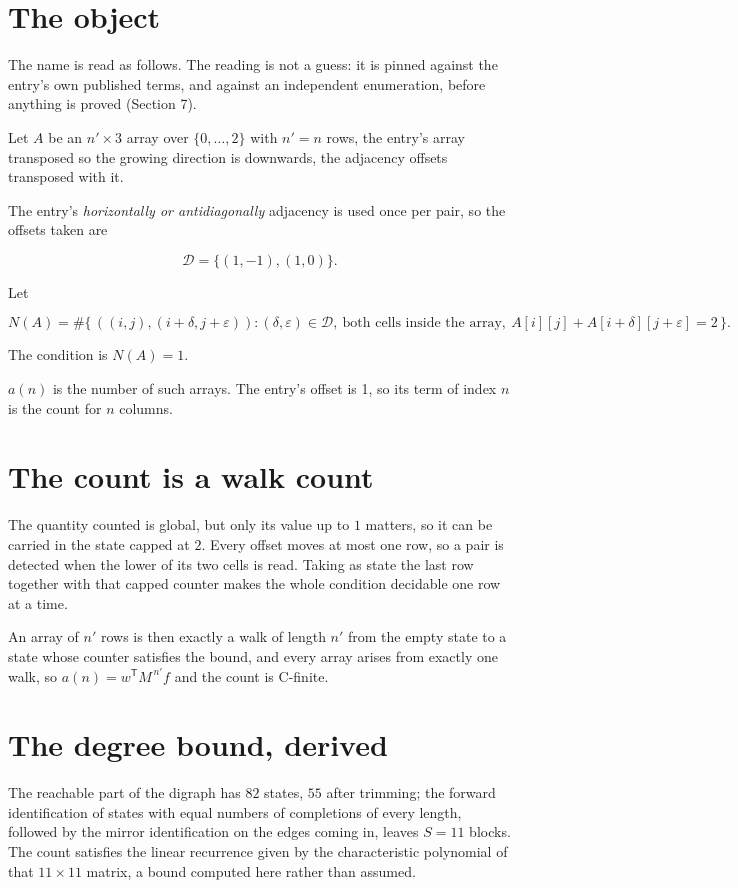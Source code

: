 \documentclass[11pt]{article}
\theoremstyle{definition}
\begin{document}
\section{The object}

The name is read as follows. The reading is not a guess: it is pinned against the entry's own published terms, and against an independent enumeration, before anything is proved (Section 7).

Let $A$ be an $n' \times 3$ array over $\{0,\dots,2\}$ with $n' = n$ rows, the entry's array transposed so the growing direction is downwards, the adjacency offsets transposed with it.

The entry's {\itshape horizontally or antidiagonally} adjacency is used once per pair, so the offsets taken are

\[\mathcal{D} = \{(1,-1), (1,0)\}.\]

Let

\[N(A) = \#\bigl\{\,((i,j),(i{+}\delta,j{+}\varepsilon)) : (\delta,\varepsilon) \in \mathcal{D},\ \text{both cells inside the array},\ A[i][j] + A[i{+}\delta][j{+}\varepsilon] = 2\,\bigr\}.\]

The condition is $N(A) = 1$.

$a(n)$ is the number of such arrays. The entry's offset is 1, so its term of index $n$ is the count for $n$ columns.

\section{The count is a walk count}

The quantity counted is global, but only its value up to $1$ matters, so it can be carried in the state capped at $2$. Every offset moves at most one row, so a pair is detected when the lower of its two cells is read. Taking as state the last row together with that capped counter makes the whole condition decidable one row at a time.

An array of $n'$ rows is then exactly a walk of length $n'$ from the empty state to a state whose counter satisfies the bound, and every array arises from exactly one walk, so $a(n) = w^{\mathsf T}M^{\,n'}f$ and the count is C-finite.

\section{The degree bound, derived}

The reachable part of the digraph has $82$ states, $55$ after trimming; the forward identification of states with equal numbers of completions of every length, followed by the mirror identification on the edges coming in, leaves $S = 11$ blocks. The count satisfies the linear recurrence given by the characteristic polynomial of that $11\times11$ matrix, a bound computed here rather than assumed.
\end{document}
